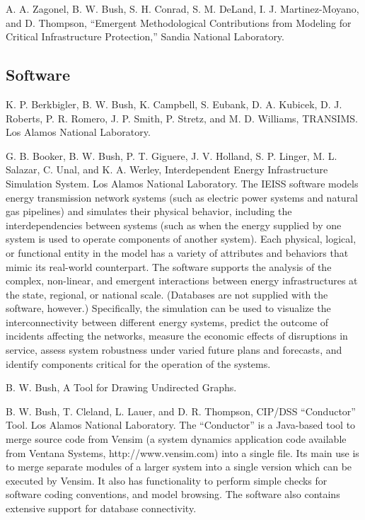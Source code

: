 \documentclass[]{article}
\begin{document}
A. A. Zagonel, B. W. Bush, S. H. Conrad, S. M. DeLand, I. J.
Martinez-Moyano, and D. Thompson, ``Emergent Methodological
Contributions from Modeling for Critical Infrastructure Protection,''
Sandia National Laboratory.

\subsection{Software}\label{software}

K. P. Berkbigler, B. W. Bush, K. Campbell, S. Eubank, D. A. Kubicek, D.
J. Roberts, P. R. Romero, J. P. Smith, P. Stretz, and M. D. Williams,
TRANSIMS. Los Alamos National Laboratory.

G. B. Booker, B. W. Bush, P. T. Giguere, J. V. Holland, S. P. Linger, M.
L. Salazar, C. Unal, and K. A. Werley, Interdependent Energy
Infrastructure Simulation System. Los Alamos National Laboratory. The
IEISS software models energy transmission network systems (such as
electric power systems and natural gas pipelines) and simulates their
physical behavior, including the interdependencies between systems (such
as when the energy supplied by one system is used to operate components
of another system). Each physical, logical, or functional entity in the
model has a variety of attributes and behaviors that mimic its
real-world counterpart. The software supports the analysis of the
complex, non-linear, and emergent interactions between energy
infrastructures at the state, regional, or national scale. (Databases
are not supplied with the software, however.) Specifically, the
simulation can be used to visualize the interconnectivity between
different energy systems, predict the outcome of incidents affecting the
networks, measure the economic effects of disruptions in service, assess
system robustness under varied future plans and forecasts, and identify
components critical for the operation of the systems.

B. W. Bush, A Tool for Drawing Undirected Graphs.

B. W. Bush, T. Cleland, L. Lauer, and D. R. Thompson, CIP/DSS
``Conductor'' Tool. Los Alamos National Laboratory. The ``Conductor'' is
a Java-based tool to merge source code from Vensim (a system dynamics
application code available from Ventana Systems, http://www.vensim.com)
into a single file. Its main use is to merge separate modules of a
larger system into a single version which can be executed by Vensim. It
also has functionality to perform simple checks for software coding
conventions, and model browsing. The software also contains extensive
support for database connectivity.
\end{document}
